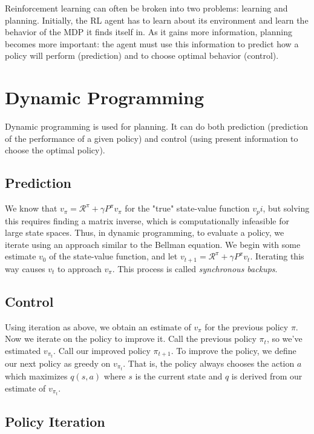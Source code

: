 \documentclass{article}
\newcommand{\ita}{\textit}
\begin{document}
Reinforcement learning can often be broken into two problems: learning and planning. Initially, the RL agent has to learn about its environment and learn the behavior of the MDP it finds itself in. As it gains more information, planning becomes more important: the agent must use this information to predict how a policy will perform (prediction) and to choose optimal behavior (control).

\section{Dynamic Programming}

Dynamic programming is used for planning. It can do both prediction (prediction of the performance of a given policy) and control (using present information to choose the optimal policy).

\subsection{Prediction}

We know that $v_\pi = \mathcal{R}^\pi + \gamma P^\pi v_\pi$ for the "true" state-value function $v_pi$, but solving this requires finding a matrix inverse, which is computationally infeasible for large state spaces. Thus, in dynamic programming, to evaluate a policy, we iterate using an approach similar to the Bellman equation. We begin with some estimate $v_0$ of the state-value function, and let $v_{t+1} =  \mathcal{R}^\pi + \gamma P^\pi v_t$. Iterating this way causes $v_t$ to approach $v_\pi$. This process is called \ita{synchronous backups}.

\subsection{Control}

Using iteration as above, we obtain an estimate of $v_\pi$ for the previous policy $\pi$. Now we iterate on the policy to improve it. Call the previous policy $\pi_t$, so we've estimated $v_{\pi_t}$. Call our improved policy $\pi_{t+1}$. To improve the policy, we define our next policy as greedy on $v_{\pi_t}$. That is, the policy always chooses the action $a$ which maximizes $q(s, a)$ where $s$ is the current state and $q$ is derived from our estimate of $v_{\pi_t}$.

\subsection{Policy Iteration}
\end{document}
